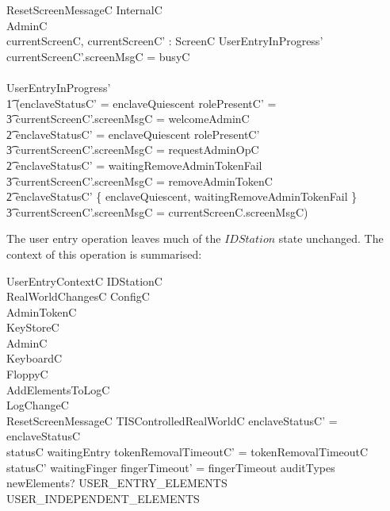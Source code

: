 \begin{schema}{ResetScreenMessageC}
        \Delta InternalC
\\      \Delta AdminC
\\      currentScreenC, currentScreenC' : ScreenC
\where
        UserEntryInProgress'
 \land currentScreenC'.screenMsgC = busyC
\\      \lor
\\      \lnot UserEntryInProgress' 
\\ \t1 \land (enclaveStatusC' = enclaveQuiescent \land rolePresentC' = \Nil 
\\ \t3          \land currentScreenC'.screenMsgC = welcomeAdminC
\\ \t2 \lor enclaveStatusC' = enclaveQuiescent \land rolePresentC' \neq \Nil 
\\ \t3          \land currentScreenC'.screenMsgC = requestAdminOpC
\\ \t2 \lor enclaveStatusC' = waitingRemoveAdminTokenFail 
\\ \t3          \land currentScreenC'.screenMsgC = removeAdminTokenC
\\ \t2 \lor enclaveStatusC' \notin 
        \{ enclaveQuiescent, waitingRemoveAdminTokenFail \} 
\\ \t3          \land currentScreenC'.screenMsgC = currentScreenC.screenMsgC)
\end{schema}

The user entry operation leaves much of the $IDStation$ state
unchanged. The context of this operation is summarised:

\begin{schema}{UserEntryContextC}
        \Delta IDStationC
\\      RealWorldChangesC
\also
        \Xi ConfigC
\\      \Xi AdminTokenC
\\      \Xi KeyStoreC
\\      \Xi AdminC
\\      \Xi KeyboardC
\\      \Xi FloppyC
\\      AddElementsToLogC
\\      LogChangeC
\\      ResetScreenMessageC
\also
      \Xi TISControlledRealWorldC
\where
        enclaveStatusC' = enclaveStatusC
\\      statusC \neq waitingEntry \implies tokenRemovalTimeoutC' = tokenRemovalTimeoutC
\\      statusC' \neq waitingFinger \implies fingerTimeout' = fingerTimeout
\also
        auditTypes~ newElements? \subseteq USER\_ENTRY\_ELEMENTS \cup USER\_INDEPENDENT\_ELEMENTS
\end{schema} 

